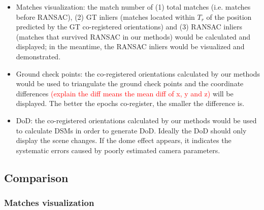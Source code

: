 \begin{itemize}
    \item Matches visualization: the match number of (1) total matches (i.e. matches before RANSAC), (2) GT inliers (matches located within $T_r$ of the position predicted by the GT co-registered orientations) and (3) RANSAC inliers (matches that survived RANSAC in our methods) would be calculated and displayed; in the meantime, the RANSAC inliers would be visualized and demonstrated.
    \item Ground check points: the co-registered orientations calculated by our methods would be used to triangulate the ground check points and the coordinate differences \textcolor{red}{(explain the diff means the mean diff of x, y and z)} will be displayed. The better the epochs co-register, the smaller the difference is.
    \item DoD: the co-registered orientations calculated by our methods would be used to calculate DSMs in order to generate DoD. Ideally the DoD should only display the scene changes. If the dome effect appears, it indicates the systematic errors caused by poorly estimated camera parameters.   
\end{itemize}

\subsection{Comparison}

\subsubsection{Matches visualization}

